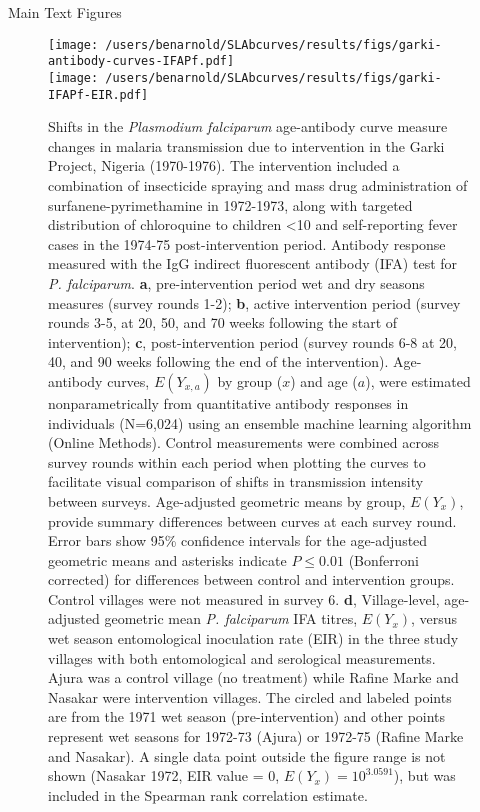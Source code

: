 \documentclass[11pt]{article}
\title{}
\author{}
\date{}
\begin{document}
\begin{center}
{\Large Main Text Figures}
\end{center}
\vspace{50pt}


\renewcommand{\figurename}{Fig.}


\begin{figure}[htbp]
\begin{center}
\texttt{[image: /users/benarnold/SLAbcurves/results/figs/garki-antibody-curves-IFAPf.pdf]} \\ 
\texttt{[image: /users/benarnold/SLAbcurves/results/figs/garki-IFAPf-EIR.pdf]}
\begin{minipage}{\textwidth}
\caption{Shifts in the \textit{Plasmodium falciparum} age-antibody curve measure changes in malaria transmission due to intervention in the Garki Project, Nigeria (1970-1976). The intervention included a combination of insecticide spraying and mass drug administration of surfanene-pyrimethamine in 1972-1973, along with targeted distribution of chloroquine to children <10 and self-reporting fever cases in the 1974-75 post-intervention period. Antibody response measured with the IgG indirect fluorescent antibody (IFA) test for \textit{P. falciparum}. \textbf{a}, pre-intervention period wet and dry seasons measures (survey rounds 1-2); \textbf{b}, active intervention period (survey rounds 3-5, at 20, 50, and 70 weeks following the start of intervention); \textbf{c}, post-intervention period (survey rounds 6-8 at 20, 40, and 90 weeks following the end of the intervention).  Age-antibody curves, $E(Y_{x,a})$ by group ($x$) and age ($a$), were estimated nonparametrically from quantitative antibody responses in individuals (N=6,024) using an ensemble machine learning algorithm (Online Methods). Control measurements were combined across survey rounds within each period when plotting the curves to facilitate visual comparison of shifts in transmission intensity between surveys. Age-adjusted geometric means by group, $E(Y_x)$, provide summary differences between curves at each survey round. Error bars show 95\% confidence intervals for the age-adjusted geometric means and asterisks indicate $P\leq0.01$ (Bonferroni corrected) for differences between control and intervention groups. Control villages were not measured in survey 6. \textbf{d}, Village-level, age-adjusted geometric mean \textit{P. falciparum} IFA titres, $E(Y_x)$, versus wet season entomological inoculation rate (EIR) in the three study villages with both entomological and serological measurements. Ajura was a control village (no treatment) while Rafine Marke and Nasakar were intervention villages.  The circled and labeled points are from the 1971 wet season (pre-intervention) and other points represent wet seasons for 1972-73 (Ajura) or 1972-75 (Rafine Marke and Nasakar). A single data point outside the figure range is not shown (Nasakar 1972, EIR value = 0, $E(Y_x) = 10^{3.0591}$), but was included in the Spearman rank correlation estimate.   }

\end{minipage}
\end{center}
\end{figure}
\end{document}
